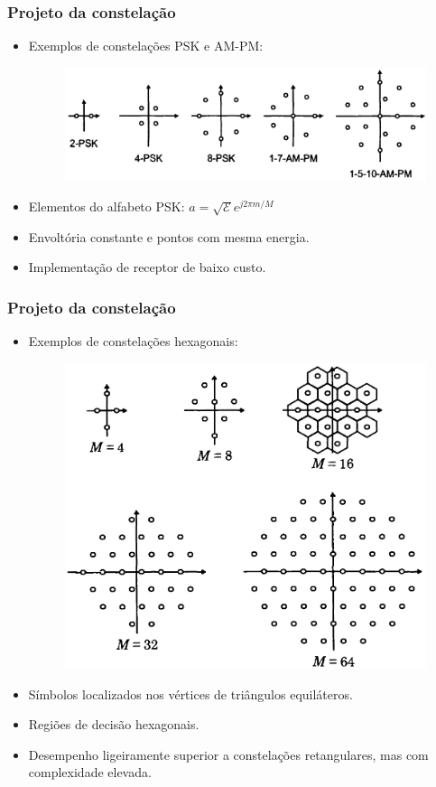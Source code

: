 \begin{frame}
	\frametitle{Projeto da constelação}

	\begin{itemize}
	    \item Exemplos de constelações PSK e AM-PM:
	    \begin{figure}[t]	
	    \begin{center}
	      \includegraphics[width=0.7\columnwidth]{figs/pam_20}
	    \end{center}
	  \end{figure}
	    \item Elementos do alfabeto PSK: $a = \sqrt{\mathcal{E}} e^{j2\pi m/M}$
	    \item Envoltória constante e pontos com mesma energia.
	    \item Implementação de receptor de baixo custo.
	\end{itemize}	
\end{frame}

\begin{frame}
	\frametitle{Projeto da constelação}

	\begin{itemize}
	    \item Exemplos de constelações hexagonais:
	    \begin{figure}[t]	
	    \begin{center}
	      \includegraphics[width=0.45\columnwidth]{figs/pam_21}
	    \end{center}
	  \end{figure}
	    \item Símbolos localizados nos vértices de triângulos equiláteros.
	    \item Regiões de decisão hexagonais.
	    \item Desempenho ligeiramente superior a constelações retangulares, mas com complexidade elevada.
	\end{itemize}	
\end{frame}

